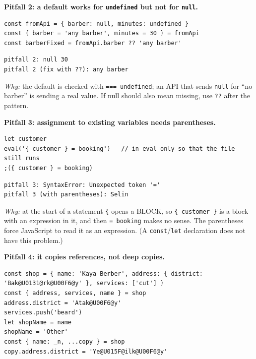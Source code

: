 \textbf{Pitfall 2: a default works for \passthrough{\lstinline!undefined!} but not for \passthrough{\lstinline!null!}.}

\begin{lstlisting}
const fromApi = { barber: null, minutes: undefined }
const { barber = 'any barber', minutes = 30 } = fromApi
const barberFixed = fromApi.barber ?? 'any barber'
\end{lstlisting}

\begin{lstlisting}
pitfall 2: null 30
pitfall 2 (fix with ??): any barber
\end{lstlisting}

\emph{Why:} the default is checked with \passthrough{\lstinline!=== undefined!}; an API that sends \passthrough{\lstinline!null!} for ``no barber'' is sending a real value.
If null should also mean missing, use \passthrough{\lstinline!??!} after the pattern.

\textbf{Pitfall 3: assignment to existing variables needs parentheses.}

\begin{lstlisting}
let customer
eval('{ customer } = booking')   // in eval only so that the file still runs
;({ customer } = booking)
\end{lstlisting}

\begin{lstlisting}
pitfall 3: SyntaxError: Unexpected token '='
pitfall 3 (with parentheses): Selin
\end{lstlisting}

\emph{Why:} at the start of a statement \passthrough{\lstinline!\{!} opens a BLOCK, so \passthrough{\lstinline!\{ customer \}!} is a block with an expression in it, and then \passthrough{\lstinline!= booking!} makes no sense.
The parentheses force JavaScript to read it as an expression. (A \passthrough{\lstinline!const!}/\passthrough{\lstinline!let!} declaration does not have this problem.)

\textbf{Pitfall 4: it copies references, not deep copies.}

\begin{lstlisting}
const shop = { name: 'Kaya Berber', address: { district: 'Bak@U0131@rk@U00F6@y' }, services: ['cut'] }
const { address, services, name } = shop
address.district = 'Atak@U00F6@y'
services.push('beard')
let shopName = name
shopName = 'Other'
const { name: _n, ...copy } = shop
copy.address.district = 'Ye@U015F@ilk@U00F6@y'
\end{lstlisting}

